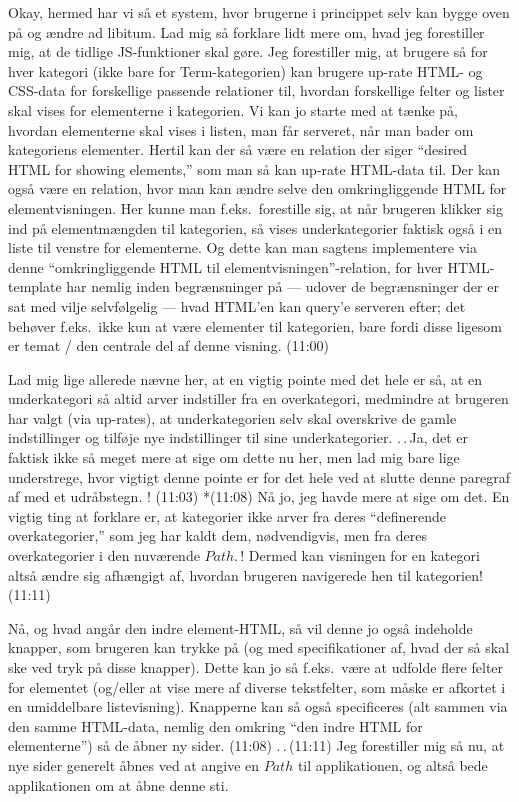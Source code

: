 \documentclass{report}
\begin{document}
Okay, hermed har vi så et system, hvor brugerne i princippet selv kan bygge oven på og ændre ad libitum. Lad mig så forklare lidt mere om, hvad jeg forestiller mig, at de tidlige JS-funktioner skal gøre. Jeg forestiller mig, at brugere så for hver kategori (ikke bare for Term-kategorien) kan brugere up-rate %
HTML- og CSS-data for forskellige passende relationer til, hvordan forskellige felter og lister skal vises for elementerne i kategorien. Vi kan jo starte med at tænke på, hvordan elementerne skal vises i listen, man får serveret, når man bader om kategoriens elementer. Hertil kan der så være en relation der siger ``desired HTML for showing elements,'' som man så kan up-rate HTML-data til. Der kan også være en relation, hvor man kan ændre selve den omkringliggende HTML for elementvisningen. Her kunne man f.eks.\ forestille sig, at når brugeren klikker sig ind på elementmængden til kategorien, så vises underkategorier faktisk også i en liste til venstre for elementerne. Og dette kan man sagtens implementere via denne ``omkringliggende HTML til elementvisningen''-relation, for hver HTML-template har nemlig inden begrænsninger på --- udover de begrænsninger der er sat med vilje selvfølgelig --- hvad HTML'en kan query'e serveren efter; det behøver f.eks.\ ikke kun at være elementer til kategorien, bare fordi disse ligesom er temat / den centrale del af denne visning. (11:00) 

Lad mig lige allerede nævne her, at en vigtig pointe med det hele er så, at en underkategori så altid arver indstiller fra en overkategori, medmindre at brugeren har valgt (via up-rates), at underkategorien selv skal overskrive de gamle indstillinger og tilføje nye indstillinger til sine underkategorier. .\,.\,Ja, det er faktisk ikke så meget mere at sige om dette nu her, men lad mig bare lige understrege, hvor vigtigt denne pointe er for det hele ved at slutte denne paregraf af med et udråbstegn. ! (11:03) *(11:08) Nå jo, jeg havde mere at sige om det. En vigtig ting at forklare er, at kategorier ikke arver fra deres ``definerende overkategorier,'' som jeg har kaldt dem, nødvendigvis, men fra deres overkategorier i den nuværende $Path$.\,! Dermed kan visningen for en kategori altså ændre sig afhængigt af, hvordan brugeren navigerede hen til kategorien! (11:11) 

Nå, og hvad angår den indre element-HTML, så vil denne jo også indeholde knapper, som brugeren kan trykke på (og med specifikationer af, hvad der så skal ske ved tryk på disse knapper). Dette kan jo så f.eks.\ være at udfolde flere felter for elementet (og/eller at vise mere af diverse tekstfelter, som måske er afkortet i en umiddelbare listevisning). Knapperne kan så også specificeres (alt sammen via den samme HTML-data, nemlig den omkring ``den indre HTML for elementerne'') så de åbner ny sider. (11:08) .\,.\,(11:11) Jeg forestiller mig så nu, at nye sider generelt åbnes ved at angive en $Path$ til applikationen, og altså bede applikationen om at åbne denne sti. 
\end{document}
